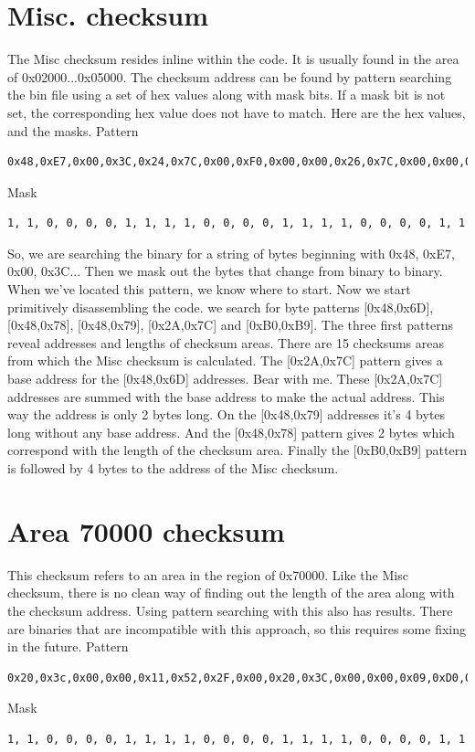 \documentclass[11pt,a4paper]{book}
\begin{document}
\section{Misc. checksum}
The Misc checksum resides inline within the code. It is usually found in the
area of 0x02000...0x05000. The checksum address can be found by pattern
searching the bin file using a set of hex values along with mask bits. If a mask
bit is not set, the corresponding hex value does not have to match. Here are the
hex values, and the masks.
Pattern
\begin{verbatim}
0x48,0xE7,0x00,0x3C,0x24,0x7C,0x00,0xF0,0x00,0x00,0x26,0x7C,0x00,0x00,0x00,0x00,0x28,0x7C,0x00,0xF0,0x00,0x00,0x2A,0x7C
\end{verbatim}
Mask
\begin{verbatim}
1, 1, 0, 0, 0, 0, 1, 1, 1, 1, 0, 0, 0, 0, 1, 1, 1, 1, 0, 0, 0, 0, 1, 1
\end{verbatim}
So, we are searching the binary for a string of bytes beginning with 0x48, 0xE7, 0x00, 0x3C... Then
we mask out the bytes that change from binary to binary. When we’ve located this pattern, we know
where to start. Now we start primitively disassembling the code. we search for byte patterns
[0x48,0x6D], [0x48,0x78], [0x48,0x79], [0x2A,0x7C] and [0xB0,0xB9]. The three first patterns reveal
addresses and lengths of checksum areas. There are 15 checksums areas from which the Misc
checksum is calculated. The [0x2A,0x7C] pattern gives a base address for the [0x48,0x6D] addresses.
Bear with me. These [0x2A,0x7C] addresses are summed with the base address to make the actual
address. This way the address is only 2 bytes long. On the [0x48,0x79] addresses it's 4 bytes long
without any base address. And the [0x48,0x78] pattern gives 2 bytes which correspond with the
length of the checksum area. Finally the [0xB0,0xB9] pattern is followed by 4 bytes to the address of
the Misc checksum.


\section{Area 70000 checksum}
This checksum refers to an area in the region of 0x70000. Like the Misc checksum, there is no clean
way of finding out the length of the area along with the checksum address. Using pattern searching
with this also has results. There are binaries that are incompatible with this approach, so this requires
some fixing in the future.
Pattern
\begin{verbatim}
0x20,0x3c,0x00,0x00,0x11,0x52,0x2F,0x00,0x20,0x3C,0x00,0x00,0x09,0xD0,0x2F,0x00,0x20,0x3C,0x00,0x00,0x00,0xCC,0xD0,0x9F
\end{verbatim}
Mask
\begin{verbatim}
1, 1, 0, 0, 0, 0, 1, 1, 1, 1, 0, 0, 0, 0, 1, 1, 1, 1, 0, 0, 0, 0, 1, 1
\end{verbatim}
\end{document}
